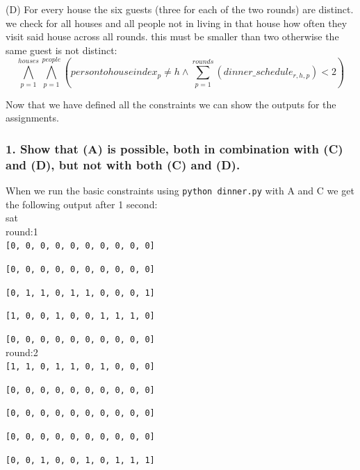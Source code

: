 \documentclass[12pt]{article}
\begin{document}
(D) For every house the six guests (three for each of the two rounds) are distinct. we check for all houses and all people not in living in that house how often they visit said house across all rounds. this must be smaller than two otherwise the same guest is not distinct:\\

\[ \bigwedge_{p=1}^{houses} \bigwedge_{p=1}^{people}  \left( persontohouseindex_{p} \neq h \land \sum_{p=1}^{rounds} \left(dinner\_schedule_{r,h,p} \right) < 2 \right)\]


Now that we have defined all the constraints we can show the outputs for the assignments.

\subsubsection*{1. Show that (A) is possible, both in combination with (C) and (D), but not with both (C) and (D).}

When we run the basic constraints using {\tt python dinner.py} with A and C we get the following output after 1 second:\\

sat\\

round:1\\

{\tt [0, 0, 0, 0, 0, 0, 0, 0, 0, 0]}

{\tt [0, 0, 0, 0, 0, 0, 0, 0, 0, 0]}

{\tt [0, 1, 1, 0, 1, 1, 0, 0, 0, 1]}

{\tt [1, 0, 0, 1, 0, 0, 1, 1, 1, 0]}

{\tt [0, 0, 0, 0, 0, 0, 0, 0, 0, 0]}\\

round:2\\

{\tt [1, 1, 0, 1, 1, 0, 1, 0, 0, 0]}

{\tt [0, 0, 0, 0, 0, 0, 0, 0, 0, 0]}

{\tt [0, 0, 0, 0, 0, 0, 0, 0, 0, 0]}

{\tt [0, 0, 0, 0, 0, 0, 0, 0, 0, 0]}

{\tt [0, 0, 1, 0, 0, 1, 0, 1, 1, 1]}\\
\end{document}
